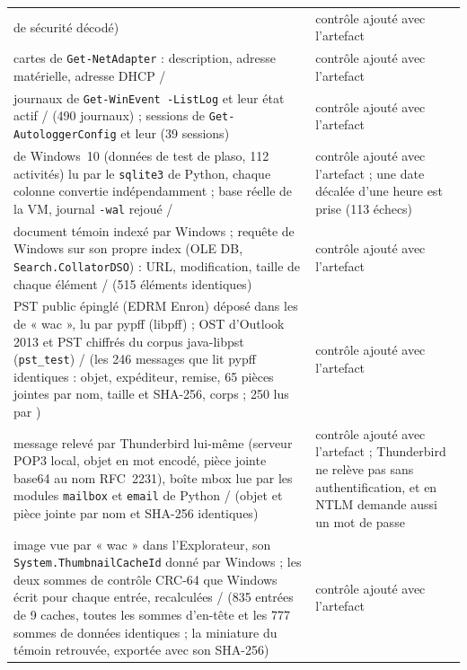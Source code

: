 \documentclass[11pt,a4paper,oneside]{report}
\begin{document}
\begin{longtable}{@{}L{6.6cm}L{8.4cm}@{}}
  de sécurité décodé) &
  contrôle ajouté avec l'artefact \\
cartes de \texttt{Get-NetAdapter} : description, adresse matérielle, adresse
  DHCP /  &
  contrôle ajouté avec l'artefact \\
journaux de \texttt{Get-WinEvent -ListLog} et leur état actif /
   (490 journaux) ; sessions de
  \texttt{Get-AutologgerConfig} et leur  (39 sessions) &
  contrôle ajouté avec l'artefact \\
 de Windows~10 (données de test de plaso, 112
  activités) lu par le \texttt{sqlite3} de Python, chaque colonne convertie
  indépendamment ; base réelle de la VM, journal \texttt{-wal} rejoué /
   &
  contrôle ajouté avec l'artefact ; une date décalée d'une heure est prise
  (113 échecs) \\
document témoin indexé par Windows ; requête de Windows sur son propre index
  (OLE DB, \texttt{Search.CollatorDSO}) : URL, modification, taille de chaque
  élément /  (515 éléments identiques) &
  contrôle ajouté avec l'artefact \\
PST public épinglé (EDRM Enron) déposé dans les  de
  « wac », lu par pypff (libpff) ; OST d'Outlook 2013 et PST chiffrés du corpus
  java-libpst (\texttt{pst\_test}) /  (les 246 messages
  que lit pypff identiques : objet, expéditeur, remise, 65 pièces jointes par
  nom, taille et SHA-256, corps ; 250 lus par \wac{}) &
  contrôle ajouté avec l'artefact \\
message relevé par Thunderbird lui-même (serveur POP3 local, objet en mot
  encodé, pièce jointe base64 au nom RFC~2231), boîte mbox lue par les modules
  \texttt{mailbox} et \texttt{email} de Python /  (objet
  et pièce jointe par nom et SHA-256 identiques) &
  contrôle ajouté avec l'artefact ; Thunderbird ne relève pas sans
  authentification, et en NTLM demande aussi un mot de passe \\
image vue par « wac » dans l'Explorateur, son \texttt{System.ThumbnailCacheId}
  donné par Windows ; les deux sommes de contrôle CRC-64 que Windows écrit
  pour chaque entrée, recalculées /  (835 entrées de
  9 caches, toutes les sommes d'en-tête et les 777 sommes de données
  identiques ; la miniature du témoin retrouvée, exportée avec son SHA-256) &
  contrôle ajouté avec l'artefact \\

\end{longtable}
\end{document}
